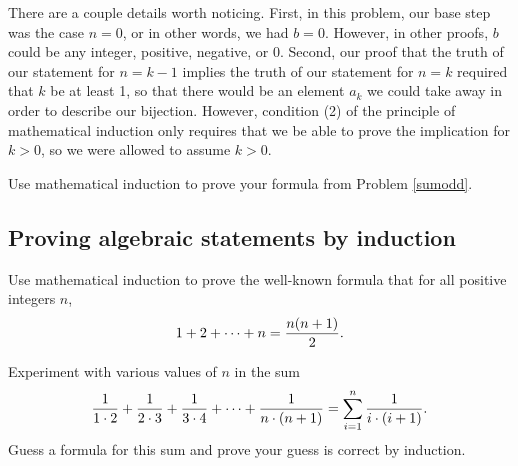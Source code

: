 There are a couple details worth noticing.  First, in this problem, our
base step was the case $n=0$, or in other words, we had $b=0$.  However,
in other proofs,
$b$ could be any integer, positive, negative, or 0.  Second, our proof
that the truth of our statement for $n=k-1$ implies the truth of our
statement for
$n=k$ required that $k$ be at least 1, so that there would be an element
$a_k$ we could take away in order to describe our bijection.  However,
condition (2) of the principle of mathematical induction only requires
that we be able to prove the implication for $k>0$, so we were allowed to
assume $k>0$.
\bp \item Use mathematical induction to prove your formula from
Problem \ref{sumodd}.
\ep
\subsection{Proving algebraic statements by induction}
\bp
\item Use mathematical induction to prove the well-known formula that for
all positive integers $n$,
$$1+2 + \cdots +n = {n(n+1)\over 2}.$$

\item Experiment with various values of $n$ in the sum
$${1\over 1\cdot2}+{1\over 2\cdot3} + {1\over3\cdot
4}+\cdots+{1\over n\cdot (n+1)} = \sum_{i=1}^n {1\over i\cdot(i+1)}.$$ 
Guess a formula for this sum and prove your guess is correct by induction.

